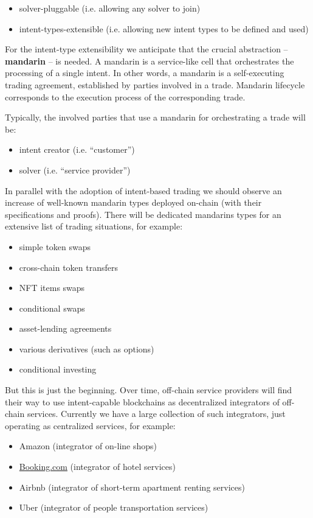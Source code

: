 \documentclass[a4paper]{article}
\begin{document}
\begin{itemize}
  \item solver-pluggable (i.e. allowing any solver to join)
  \item intent-types-extensible (i.e. allowing new intent types to be defined and used)
\end{itemize}

For the intent-type extensibility we anticipate that the crucial abstraction -- \textbf{mandarin} -- is needed. A mandarin is a service-like cell that orchestrates the processing of a single intent. In other words, a mandarin is a self-executing trading agreement, established by parties involved in a trade. Mandarin lifecycle corresponds to the execution process of the corresponding trade.

Typically, the involved parties that use a mandarin for orchestrating a trade will be:

\begin{itemize}
  \item intent creator (i.e. ``customer'')
  \item solver (i.e. ``service provider'')
\end{itemize}

In parallel with the adoption of intent-based trading we should observe an increase of well-known mandarin types deployed on-chain (with their specifications and proofs). There will be dedicated mandarins types for an extensive list of trading situations, for example:

\begin{itemize}
  \item simple token swaps
  \item cross-chain token transfers
  \item NFT items swaps
  \item conditional swaps
  \item asset-lending agreements
  \item various derivatives (such as options)
  \item conditional investing
\end{itemize}

But this is just the beginning. Over time, off-chain service providers will find their way to use intent-capable blockchains as decentralized integrators of off-chain services. Currently we have a large collection of such integrators, just operating as centralized services, for example:

\begin{itemize}
  \item Amazon (integrator of on-line shops)
  \item \href{https://Booking.com}{Booking.com} (integrator of hotel services)
  \item Airbnb (integrator of short-term apartment renting services)
  \item Uber (integrator of people transportation services)
\end{itemize}
\end{document}
